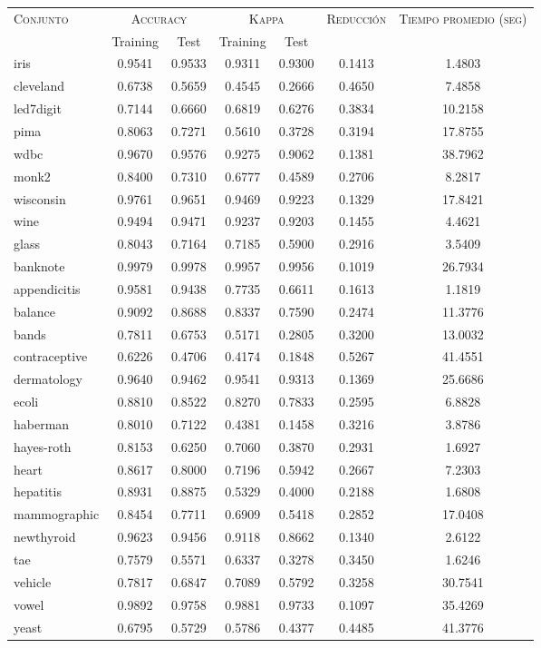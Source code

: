 \begin{table}[]
\centering
\begin{tabular}{l c c c c c c}
\hline
\multirow{2}{*}{\textsc{Conjunto}}
	& \multicolumn{2}{c}{\textsc{Accuracy}}
	& \multicolumn{2}{c}{\textsc{Kappa}}
	& \textsc{Reducción}
	& \textsc{Tiempo promedio (seg)} \\
	& Training & Test
	& Training & Test \\ 
\hline
\hline

iris & 0.9541 & 0.9533 & 0.9311 & 0.9300 & 0.1413 & 1.4803 \\
cleveland & 0.6738 & 0.5659 & 0.4545 & 0.2666 & 0.4650 & 7.4858 \\
led7digit & 0.7144 & 0.6660 & 0.6819 & 0.6276 & 0.3834 & 10.2158 \\
pima & 0.8063 & 0.7271 & 0.5610 & 0.3728 & 0.3194 & 17.8755 \\
wdbc & 0.9670 & 0.9576 & 0.9275 & 0.9062 & 0.1381 & 38.7962 \\
monk2 & 0.8400 & 0.7310 & 0.6777 & 0.4589 & 0.2706 & 8.2817 \\
wisconsin & 0.9761 & 0.9651 & 0.9469 & 0.9223 & 0.1329 & 17.8421 \\
wine & 0.9494 & 0.9471 & 0.9237 & 0.9203 & 0.1455 & 4.4621 \\
glass & 0.8043 & 0.7164 & 0.7185 & 0.5900 & 0.2916 & 3.5409 \\
banknote & 0.9979 & 0.9978 & 0.9957 & 0.9956 & 0.1019 & 26.7934 \\
appendicitis & 0.9581 & 0.9438 & 0.7735 & 0.6611 & 0.1613 & 1.1819 \\
balance & 0.9092 & 0.8688 & 0.8337 & 0.7590 & 0.2474 & 11.3776 \\
bands & 0.7811 & 0.6753 & 0.5171 & 0.2805 & 0.3200 & 13.0032 \\
contraceptive & 0.6226 & 0.4706 & 0.4174 & 0.1848 & 0.5267 & 41.4551 \\
dermatology & 0.9640 & 0.9462 & 0.9541 & 0.9313 & 0.1369 & 25.6686 \\
ecoli & 0.8810 & 0.8522 & 0.8270 & 0.7833 & 0.2595 & 6.8828 \\
haberman & 0.8010 & 0.7122 & 0.4381 & 0.1458 & 0.3216 & 3.8786 \\
hayes-roth & 0.8153 & 0.6250 & 0.7060 & 0.3870 & 0.2931 & 1.6927 \\
heart & 0.8617 & 0.8000 & 0.7196 & 0.5942 & 0.2667 & 7.2303 \\
hepatitis & 0.8931 & 0.8875 & 0.5329 & 0.4000 & 0.2188 & 1.6808 \\
mammographic & 0.8454 & 0.7711 & 0.6909 & 0.5418 & 0.2852 & 17.0408 \\
newthyroid & 0.9623 & 0.9456 & 0.9118 & 0.8662 & 0.1340 & 2.6122 \\
tae & 0.7579 & 0.5571 & 0.6337 & 0.3278 & 0.3450 & 1.6246 \\
vehicle & 0.7817 & 0.6847 & 0.7089 & 0.5792 & 0.3258 & 30.7541 \\
vowel & 0.9892 & 0.9758 & 0.9881 & 0.9733 & 0.1097 & 35.4269 \\
yeast & 0.6795 & 0.5729 & 0.5786 & 0.4377 & 0.4485 & 41.3776 \\


\end{tabular}
\end{table}

